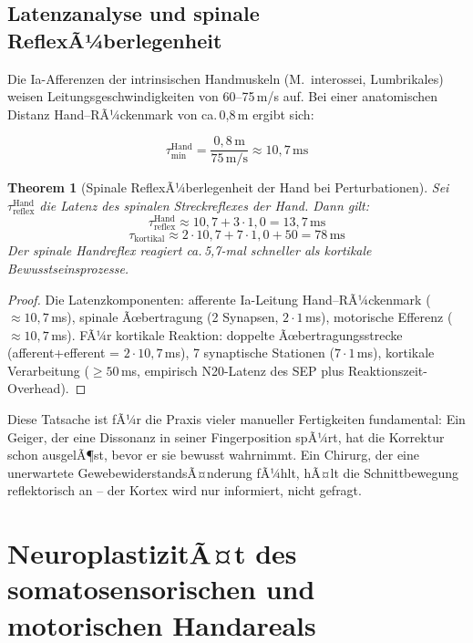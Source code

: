 ﻿\documentclass[12pt,a4paper]{report}
\theoremstyle{plain}
\newtheorem{theorem}{Theorem}[section]
\theoremstyle{definition}
\theoremstyle{remark}
\begin{document}
\section{Latenzanalyse und spinale ReflexÃ¼berlegenheit}

Die Ia-Afferenzen der intrinsischen Handmuskeln (M.\ interossei, Lumbrikales)
weisen Leitungsgeschwindigkeiten von 60--75\,m/s auf. Bei einer anatomischen
Distanz Hand--RÃ¼ckenmark von ca.\,0{,}8\,m ergibt sich:

\[
  \tau_{\min}^{\text{Hand}} = \frac{0{,}8\,\text{m}}{75\,\text{m/s}}
  \approx 10{,}7\,\text{ms}
\]

\begin{theorem}[Spinale ReflexÃ¼berlegenheit der Hand bei Perturbationen]
\label{thm:reflex}
Sei $\tau_{\text{reflex}}^{\text{Hand}}$ die Latenz des spinalen
Streckreflexes der Hand. Dann gilt:
\[
  \tau_{\text{reflex}}^{\text{Hand}} \approx 10{,}7 + 3 \cdot 1{,}0 = 13{,}7\,\text{ms}
\]
\[
  \tau_{\text{kortikal}} \approx 2 \cdot 10{,}7 + 7 \cdot 1{,}0 + 50 = 78\,\text{ms}
\]
Der spinale Handreflex reagiert ca.\,5{,}7-mal schneller als kortikale
Bewusstseinsprozesse.
\end{theorem}

\begin{proof}
Die Latenzkomponenten: afferente Ia-Leitung Hand--RÃ¼ckenmark ($\approx 10{,}7$\,ms),
spinale Ãœbertragung (2 Synapsen, $2 \cdot 1$\,ms), motorische Efferenz
($\approx 10{,}7$\,ms). FÃ¼r kortikale Reaktion: doppelte Ãœbertragungsstrecke
(afferent+efferent = $2 \cdot 10{,}7$\,ms), 7 synaptische Stationen
($7 \cdot 1$\,ms), kortikale Verarbeitung ($\geq 50$\,ms, empirisch N20-Latenz
des SEP plus Reaktionszeit-Overhead).
\end{proof}

Diese Tatsache ist fÃ¼r die Praxis vieler manueller Fertigkeiten fundamental:
Ein Geiger, der eine Dissonanz in seiner Fingerposition spÃ¼rt, hat die
Korrektur schon ausgelÃ¶st, bevor er sie bewusst wahrnimmt. Ein Chirurg,
der eine unerwartete GewebewiderstandsÃ¤nderung fÃ¼hlt, hÃ¤lt die Schnittbewegung
reflektorisch an -- der Kortex wird nur informiert, nicht gefragt.

\chapter{NeuroplastizitÃ¤t des somatosensorischen und motorischen Handareals}
\label{chap:plastizitaet}
\end{document}
